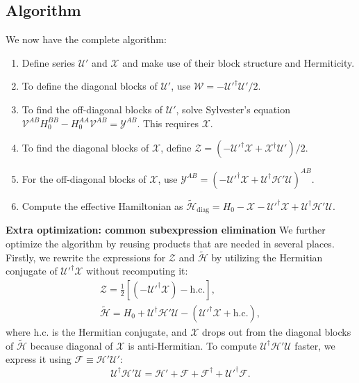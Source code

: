 \subsection{Algorithm}

We now have the complete algorithm:
%
\begin{enumerate}
    \item Define series $\mathcal{U}'$ and $\mathcal{X}$ and make use of their block structure and Hermiticity.
    \item To define the diagonal blocks of $\mathcal{U}'$, use $\mathcal{W} = -\mathcal{U}'^\dagger\mathcal{U}'/2$.
    \item To find the off-diagonal blocks of $\mathcal{U}'$, solve Sylvester's equation $\mathcal{V}^{AB}H_0^{BB} - H_0^{AA}\mathcal{V}^{AB} = \mathcal{Y}^{AB}$.
      This requires $\mathcal{X}$.
    \item To find the diagonal blocks of $\mathcal{X}$, define $\mathcal{Z} = (-\mathcal{U}'^\dagger\mathcal{X} + \mathcal{X}^\dagger\mathcal{U}')/2$.
    \item For the off-diagonal blocks of $\mathcal{X}$, use $\mathcal{Y}^{AB} =
    (-\mathcal{U}'^\dagger\mathcal{X} +
     \mathcal{U}^\dagger\mathcal{H}'\mathcal{U})^{AB}$.
    \item  Compute the effective Hamiltonian as $\tilde{\mathcal{H}}_{\textrm{diag}} = H_0 - \mathcal{X} - \mathcal{U}'^\dagger \mathcal{X} + \mathcal{U}^\dagger\mathcal{H'}\mathcal{U}$.
\end{enumerate}
%
\textbf{Extra optimization: common subexpression elimination}
%
We further optimize the algorithm by reusing products that are needed in several
places.
%
Firstly, we rewrite the expressions for $\mathcal{Z}$ and $\tilde{\mathcal{H}}$
by utilizing the Hermitian conjugate of $\mathcal{U}'^\dagger \mathcal{X}$ without recomputing it:
%
\begin{gather*}
\mathcal{Z} = \frac{1}{2}[(-\mathcal{U}'^\dagger \mathcal{X})- \textrm{h.c.}],\\
\tilde{\mathcal{H}} = H_0 + \mathcal{U}^\dagger \mathcal{H}' \mathcal{U} - (\mathcal{U}'^\dagger \mathcal{X} + \textrm{h.c.}),
\end{gather*}
%
where $\textrm{h.c.}$ is the Hermitian conjugate, and $\mathcal{X}$ drops out from the diagonal blocks of $\tilde{\mathcal{H}}$ because diagonal of $\mathcal{X}$ is anti-Hermitian.
%
To compute $\mathcal{U}^\dagger \mathcal{H}' \mathcal{U}$ faster, we express it
using $\mathcal{F} \equiv \mathcal{H}'\mathcal{U}'$:
%
$$
\mathcal{U}^\dagger \mathcal{H}' \mathcal{U} = \mathcal{H}' + \mathcal{F} + \mathcal{F}^\dagger + \mathcal{U}'^\dagger \mathcal{F}.
$$
